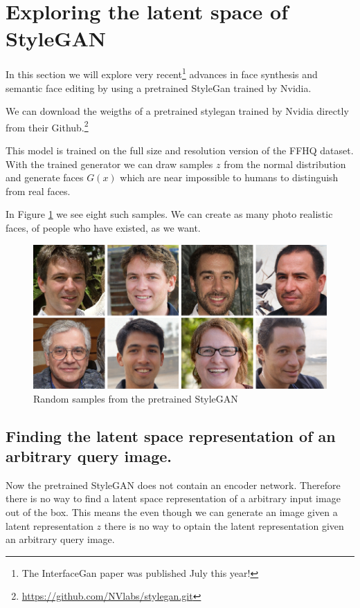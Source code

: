 
\section{Exploring the latent space of StyleGAN}
\label{stylegan}

In this section we will explore very recent\footnote{The InterfaceGan paper was published July this year!} advances in face synthesis and semantic face editing by using a pretrained StyleGan trained by Nvidia. 

We can download the weigths of a pretrained stylegan trained by Nvidia directly from their Github.\footnote{\url{https://github.com/NVlabs/stylegan.git}}\cite{stylegan}

This model is trained on the full size and resolution version of the FFHQ dataset.
With the trained generator we can draw samples $z$ from the normal distribution and generate faces $G(x)$ which are near impossible to humans to distinguish from real faces.

In Figure \ref{StyleGAN-examples} we see eight such samples. We can create as many photo realistic faces, of people who have existed, as we want.
\begin{figure}[h!]
  \includegraphics[width=\textwidth]{fig/stylegan/randomsamples}
  \caption{Random samples from the pretrained StyleGAN}
  \label{StyleGAN-examples}
\end{figure}



\subsection{Finding the latent space representation of an arbitrary query image.}

Now the pretrained StyleGAN does not contain an encoder network. Therefore there is no way to find a latent space representation of a arbitrary input image out of the box. This means the even though we can generate an image given a latent representation $z$ there is no way to optain the latent representation given an arbitrary query image. 

